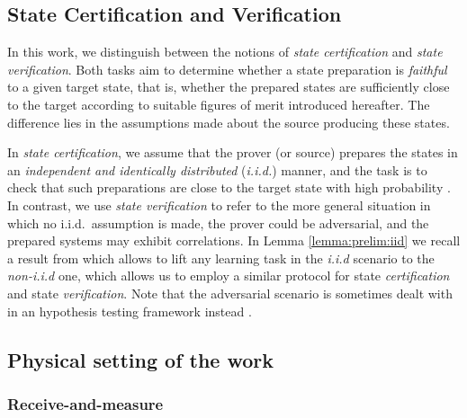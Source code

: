 \documentclass[a4paper,twocolumn,11pt,unpublished]{quantumarticle}
\begin{document}
\subsection{State Certification and Verification}
\label{subsection:prelims:iid}
In this work, we distinguish between the notions of \emph{state certification} and \emph{state verification}.
Both tasks aim to determine whether a state preparation is \emph{faithful} to a given target state, that is, whether the prepared states are sufficiently close to the target according to suitable figures of merit introduced hereafter.
The difference lies in the assumptions made about the source producing these states.

In \emph{state certification}, we assume that the prover (or source) prepares the states in an \emph{independent and identically distributed} (\emph{i.i.d.}) manner, and the task is to check that such preparations are close to the target state with high probability \cite{FL11direct, FOS24optimal, CGKM21efficient, GHO25few, HPS24certifying}.
In contrast, we use \emph{state verification} to refer to the more general situation in which no i.i.d.\ assumption is made, the prover could be adversarial, and the prepared systems may exhibit correlations. In Lemma \ref{lemma:prelim:iid} we recall a result from \cite{FKMO24learning} which allows to lift any learning task in the \emph{i.i.d} scenario to the \emph{non-i.i.d} one, which allows us to employ a similar protocol for state \emph{certification} and state \emph{verification}. Note that the adversarial scenario is sometimes dealt with in an hypothesis testing framework instead \cite{ZH18efficient, ZH19efficient, LZH23robust, LZ25universal}.

\subsection{Physical setting of the work}
\label{subection:prelims:physical setting}

\subsubsection{Receive-and-measure}
\label{subection:prelims:RnM}
\end{document}
